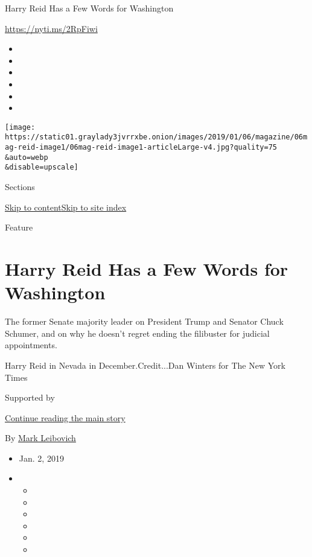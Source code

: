 Harry Reid Has a Few Words for Washington

\url{https://nyti.ms/2RpFiwi}

\begin{itemize}
\item
\item
\item
\item
\item
\item
\end{itemize}

\texttt{[image: https://static01.graylady3jvrrxbe.onion/images/2019/01/06/magazine/06mag-reid-image1/06mag-reid-image1-articleLarge-v4.jpg?quality=75\\\&auto=webp\\\&disable=upscale]}

Sections

\protect\hyperlink{site-content}{Skip to
content}\protect\hyperlink{site-index}{Skip to site index}

Feature

\hypertarget{harry-reid-has-a-few-words-for-washington}{%
\section{Harry Reid Has a Few Words for
Washington}\label{harry-reid-has-a-few-words-for-washington}}

The former Senate majority leader on President Trump and Senator Chuck
Schumer, and on why he doesn't regret ending the filibuster for judicial
appointments.

Harry Reid in Nevada in December.Credit...Dan Winters for The New York
Times

Supported by

\protect\hyperlink{after-sponsor}{Continue reading the main story}

By \href{https://www.nytimes3xbfgragh.onion/by/mark-leibovich}{Mark
Leibovich}

\begin{itemize}
\item
  Jan. 2, 2019
\item
  \begin{itemize}
  \item
  \item
  \item
  \item
  \item
  \item
  \end{itemize}
\end{itemize}


